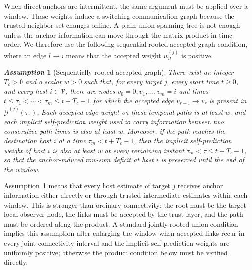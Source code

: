 \documentclass[letterpaper,journal]{IEEEtran}
\def\V{\mathcal{V}} %
\def\G{\mathcal{G}} %
\newtheorem{assumption}{\it Assumption}%
\begin{document}
When direct anchors are intermittent, the same argument must be applied over a window. These weights induce a switching communication graph because the trusted-neighbor set changes online. A plain union spanning tree is not enough unless the anchor information can move through the matrix product in time order. We therefore use the following sequential rooted accepted-graph condition, where an edge $l\to i$ means that the accepted weight $w_{il}^{(j)}$ is positive.
\begin{assumption}[Sequentially rooted accepted graph]\label{ass_graph}
There exist an integer $T_c>0$ and a scalar $\underline w>0$ such that, for every target $j$, every start time $t\ge0$, and every host $i\in\V$, there are nodes $v_0=0,v_1,\ldots,v_m=i$ and times $t\le \tau_1<\cdots<\tau_m\le t+T_c-1$ for which the accepted edge $v_{r-1}\to v_r$ is present in $\bar{\G}^{(j)}(\tau_r)$. Each accepted edge weight on these temporal paths is at least $\underline w$, and each implicit self-prediction weight used to carry information between two consecutive path times is also at least $\underline w$. Moreover, if the path reaches the destination host $i$ at a time $\tau_m<t+T_c-1$, then the implicit self-prediction weight of host $i$ is also at least $\underline w$ at every remaining instant $\tau_m<\tau\le t+T_c-1$, so that the anchor-induced row-sum deficit at host $i$ is preserved until the end of the window.
\end{assumption}
Assumption~\ref{ass_graph} means that every host estimate of target $j$ receives anchor information either directly or through trusted intermediate estimates within each window. This is stronger than ordinary connectivity: the root must be the target-local observer node, the links must be accepted by the trust layer, and the path must be ordered along the product. A standard jointly rooted union condition implies this assumption after enlarging the window when accepted links recur in every joint-connectivity interval and the implicit self-prediction weights are uniformly positive; otherwise the product condition below must be verified directly.
\end{document}
